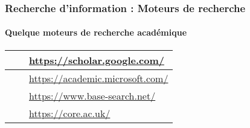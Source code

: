 \documentclass[xcolor=table]{beamer}
\begin{document}
\begin{frame}
\frametitle{Recherche d'information : Moteurs de recherche}
\framesubtitle{Quelque moteurs de recherche académique}

\def\arraystretch{0}
\begin{tabular}{L{.3\textwidth}{1cm}cp{.6\textwidth}}%
	
	\hline
	
	 &
	&
	\url{https://scholar.google.com/} \\
	
	\hline
	
	 &
	& 
	\url{https://academic.microsoft.com/}  \\
	
	\hline
	
	 &
	& 
	\url{https://www.base-search.net/} \\
	
	\hline
	
	 & 
	& 
	\url{https://core.ac.uk/} \\
	
	\hline
	
\end{tabular}


\end{frame}
\end{document}
